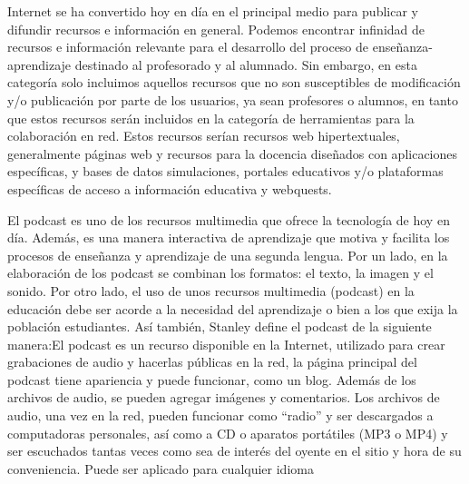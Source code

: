 Internet se ha convertido hoy en día en el principal medio para publicar y difundir recursos e 
información en general. Podemos encontrar infinidad de recursos e información relevante para el 
desarrollo del proceso de enseñanza- aprendizaje destinado al profesorado y al alumnado. Sin embargo,
en esta categoría solo incluimos aquellos recursos que no son susceptibles de modificación y/o
publicación por parte de los usuarios, ya sean profesores o alumnos, en tanto que estos recursos serán
incluidos en la categoría de herramientas para la colaboración en red. Estos recursos serían recursos
web hipertextuales, generalmente páginas web y recursos para la docencia diseñados con aplicaciones
específicas, y bases de datos simulaciones, portales educativos y/o plataformas específicas de acceso a
información educativa y webquests. 

\normalsize

El podcast es uno de los recursos multimedia que ofrece la tecnología de hoy en día. Además, es una 
manera interactiva de aprendizaje que motiva y facilita los procesos de enseñanza y aprendizaje de una
segunda lengua. Por un lado, en la elaboración de los podcast se combinan los formatos: el texto, la imagen
y el sonido. Por otro lado, el uso de unos recursos multimedia (podcast) en la educación debe ser acorde a
la necesidad del aprendizaje o bien a los que exija la población estudiantes. Así también, Stanley define
el podcast de la siguiente manera:El podcast es un recurso disponible en la Internet, utilizado para crear
grabaciones de audio y hacerlas públicas en la red, la página principal del podcast tiene apariencia y puede
funcionar, como un blog. Además de los archivos de audio, se pueden agregar imágenes y comentarios. Los 
archivos de audio, una vez en la red, pueden funcionar como “radio” y ser descargados a computadoras 
personales, así como a CD o aparatos portátiles (MP3 o MP4) y ser escuchados tantas veces como sea de interés
del oyente en el sitio y hora de su conveniencia. Puede ser aplicado para cualquier
idioma

\scriptsize

